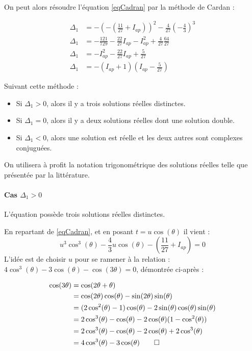 \documentclass[12pt,a4paper,onecolumn]{article}
\begin{document}
On peut alors résoudre l'équation \ref{eqCadran} par la méthode de Cardan :

\begin{align}
\Delta_1 &= -\left(-\left(\frac{11}{27} + I_{ap}\right)\right)^2 - \frac{4}{27}\left(-\frac{4}{3}\right)^3 \nonumber\\
\Delta_1 &= -\frac{121}{729} - \frac{22}{27}I_{ap} - I_{ap}^2 + \frac{4}{27}\frac{64}{27} \nonumber\\
\Delta_1 &= -I_{ap}^2 - \frac{22}{27}I_{ap} + \frac{5}{27} \nonumber\\
\Delta_1 &= -(I_{ap} + 1)(I_{ap} - \frac{5}{27})
\label{Delta1}
\end{align}

Suivant cette méthode :
\begin{itemize}
\item Si $\Delta_1 > 0$, alors il y a trois solutions réelles distinctes.
\item Si $\Delta_1 = 0$, alors il y a deux solutions réelles dont une solution double.
\item Si $\Delta_1 < 0$, alors une solution est réelle et les deux autres sont complexes conjuguées.
\end{itemize}
On utilisera à profit la notation trigonométrique des solutions réelles telle que présentée par la littérature.

\paragraph{Cas $\Delta_1 > 0$} L'équation possède trois solutions réelles distinctes.


En repartant de \ref{eqCadran}, et en posant $t = u\cos(\theta)$ il vient :
\begin{equation}
u^3\cos^3(\theta) -\frac{4}{3}u\cos(\theta)-\left(\frac{11}{27} + I_{ap}\right) = 0
\label{equcos}
\end{equation}
L'idée est de choisir $u$ pour se ramener à la relation :
$ 4\cos^3(\theta) - 3\cos(\theta)-\cos(3\theta) = 0 $, démontrée ci-après :

\begin{align*}
  \cos(3\theta)
  &= \cos(2\theta + \theta)\\
  &= \cos(2\theta)\cos(\theta) - \sin(2\theta)\sin(\theta) \\
  &= (2\cos^2(\theta) - 1)\cos(\theta) - 2\sin(\theta)\cos(\theta)\sin(\theta)\\
  &= 2\cos^3(\theta) - \cos(\theta) - 2\cos(\theta)(1-\cos^2(\theta))\\
  &= 2\cos^3(\theta) - \cos(\theta) - 2\cos(\theta) + 2\cos^3(\theta)\\
  &= 4\cos^3(\theta) - 3\cos(\theta) \qedhere
\end{align*}
\end{document}

